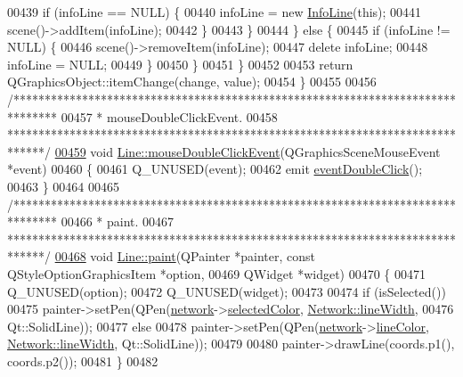 \begin{DoxyCode}
00439         \textcolor{keywordflow}{if} (infoLine == NULL) \{
00440           infoLine = \textcolor{keyword}{new} \hyperlink{class_info_line}{InfoLine}(\textcolor{keyword}{this});
00441           scene()->addItem(infoLine);
00442         \}
00443       \}
00444     \} \textcolor{keywordflow}{else} \{
00445       \textcolor{keywordflow}{if} (infoLine != NULL) \{
00446         scene()->removeItem(infoLine);
00447         \textcolor{keyword}{delete} infoLine;
00448         infoLine = NULL;
00449       \}
00450     \}
00451   \}
00452 
00453   \textcolor{keywordflow}{return} QGraphicsObject::itemChange(change, value);
00454 \}
00455 
00456 \textcolor{comment}{/*******************************************************************************}
00457 \textcolor{comment}{ * mouseDoubleClickEvent.}
00458 \textcolor{comment}{ ******************************************************************************/}
\hypertarget{line_8cpp_source_l00459}{}\hyperlink{group___models_ga9a1fee5b1606ab0deedd04bdab99be70}{00459} \textcolor{keywordtype}{void} \hyperlink{group___models_ga9a1fee5b1606ab0deedd04bdab99be70}{Line::mouseDoubleClickEvent}(QGraphicsSceneMouseEvent *event)
00460 \{
00461   Q\_UNUSED(event);
00462   emit \hyperlink{class_line_a2444b577ea2254994599c6f829c629a5}{eventDoubleClick}();
00463 \}
00464 
00465 \textcolor{comment}{/*******************************************************************************}
00466 \textcolor{comment}{ * paint.}
00467 \textcolor{comment}{ ******************************************************************************/}
\hypertarget{line_8cpp_source_l00468}{}\hyperlink{group___models_ga0aa64aed379d434be5942edf572b444b}{00468} \textcolor{keywordtype}{void} \hyperlink{group___models_ga0aa64aed379d434be5942edf572b444b}{Line::paint}(QPainter *painter, \textcolor{keyword}{const} QStyleOptionGraphicsItem *option,
00469                  QWidget *widget)
00470 \{
00471   Q\_UNUSED(option);
00472   Q\_UNUSED(widget);
00473 
00474   \textcolor{keywordflow}{if} (isSelected())
00475     painter->setPen(QPen(\hyperlink{class_line_aefdf6a6c3e3775b5a16b344c1d33964e}{network}->\hyperlink{group___graphics_gaa9e21b8e2a24b0495e776a51e1aeed94}{selectedColor}, 
      \hyperlink{group___graphics_ga3f810634c9908d62d33a1ab09a76c147}{Network::lineWidth},
00476                          Qt::SolidLine));
00477   \textcolor{keywordflow}{else}
00478     painter->setPen(QPen(\hyperlink{class_line_aefdf6a6c3e3775b5a16b344c1d33964e}{network}->\hyperlink{class_network_a453db7f1a994603fe4d38ac5899eb09c}{lineColor}, \hyperlink{group___graphics_ga3f810634c9908d62d33a1ab09a76c147}{Network::lineWidth}, 
      Qt::SolidLine));
00479 
00480   painter->drawLine(coords.p1(), coords.p2());
00481 \}
00482 
\end{DoxyCode}
